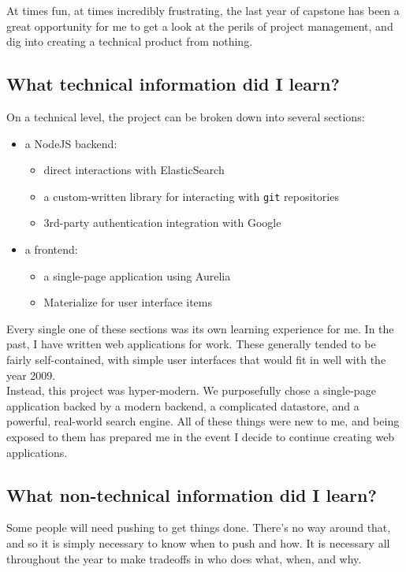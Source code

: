 \documentclass[onecolumn, draftclsnofoot,10pt, compsoc]{IEEEtran}
\begin{document}
At times fun, at times incredibly frustrating, the last year of capstone has been
a great opportunity for me to get a look at the perils of project management, and
dig into creating a technical product from nothing.

\subsection{What technical information did I learn?}

On a technical level, the project can be broken down into several sections:

\begin{itemize}
	\item a NodeJS backend:
	\begin{itemize}
		\item direct interactions with ElasticSearch
		\item a custom-written library for interacting with \verb|git| repositories
		\item 3rd-party authentication integration with Google
	\end{itemize}
	\item a frontend:
	\begin{itemize}
		\item a single-page application using Aurelia
		\item Materialize for user interface items
	\end{itemize}
\end{itemize}

Every single one of these sections was its own learning experience for me. In the
past, I have written web applications for work. These generally tended to be fairly
self-contained, with simple user interfaces that would fit in well with the year 2009. \\

Instead, this project was hyper-modern. We purposefully chose a single-page application
backed by a modern backend, a complicated datastore, and a powerful, real-world
search engine. All of these things were new to me, and being exposed to them has
prepared me in the event I decide to continue creating web applications.

\subsection{What non-technical information did I learn?}

Some people will need pushing to get things done. There's no way around that, and
so it is simply necessary to know when to push and how. It is necessary all throughout
the year to make tradeoffs in who does what, when, and why.
\end{document}
